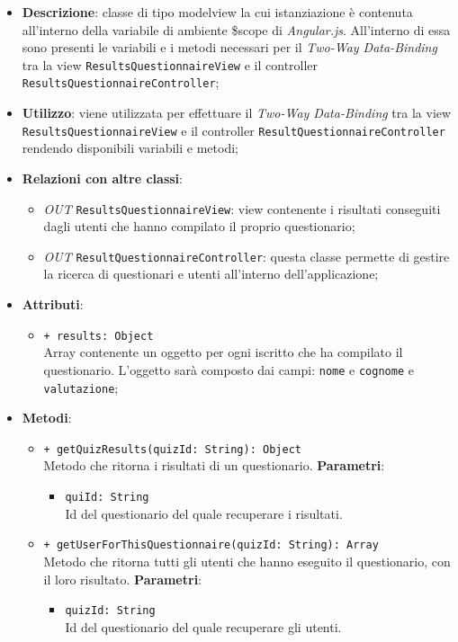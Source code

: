 	\begin{itemize}
		\item \textbf{Descrizione}: classe di tipo modelview la cui istanziazione è contenuta all'interno della variabile di ambiente \$scope di \textit{Angular.js}. All'interno di essa sono presenti le variabili e i metodi necessari per il \textit{Two-Way Data-Binding} tra la view \texttt{ResultsQuestionnaireView} e il controller \texttt{ResultsQuestionnaireController};
		\item \textbf{Utilizzo}: viene utilizzata per effettuare il \textit{Two-Way Data-Binding} tra la view \texttt{ResultsQuestionnaireView} e il controller \texttt{ResultQuestionnaireController} rendendo disponibili variabili e metodi;
		\item \textbf{Relazioni con altre classi}: 
		\begin{itemize}
			\item \textit{OUT} \texttt{ResultsQuestionnaireView}: view contenente i risultati conseguiti dagli utenti che hanno compilato il proprio questionario; 
			\item \textit{OUT} \texttt{ResultQuestionnaireController}: questa classe permette di gestire la ricerca di questionari e utenti all’interno dell’applicazione;
		\end{itemize}
		\item \textbf{Attributi}: 
		\begin{itemize}
				\item \texttt{+ results: Object} \\ Array contenente un oggetto per ogni iscritto che ha compilato il questionario. L'oggetto sarà composto dai campi: \texttt{nome} e \texttt{cognome} e \texttt{valutazione};
		\end{itemize}
		\item \textbf{Metodi}: 
		\begin{itemize}
			\item \texttt{+ getQuizResults(quizId: String): Object} \\ Metodo che ritorna i risultati di un questionario.
			\textbf{Parametri}:
			\begin{itemize}
				\item \texttt{quiId: String} \\ Id del questionario del quale recuperare i risultati.
			\end{itemize}
			\item \texttt{+ getUserForThisQuestionnaire(quizId: String): Array} \\ Metodo che ritorna tutti gli utenti che hanno eseguito il questionario, con il loro risultato.
			\textbf{Parametri}:
			\begin{itemize}
				\item \texttt{quizId: String} \\ Id del questionario del quale recuperare gli utenti.
			\end{itemize}
				
		\end{itemize}
	\end{itemize}

	